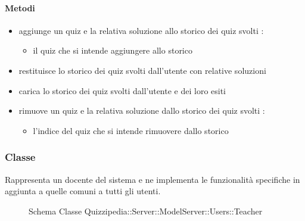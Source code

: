 \paragraph{Metodi}
\begin{itemize}
\item {}
\newline
aggiunge un quiz e la relativa soluzione allo storico dei quiz svolti
\newline
{} :
\begin{itemize}
\item {}
\newline
il quiz che si intende aggiungere allo storico
\end{itemize}
\item {}
\newline
restituisce lo storico dei quiz svolti dall'utente con relative soluzioni
\newline
\item {}
\newline
carica lo storico dei quiz svolti dall'utente e dei loro esiti
\newline
\item {}
\newline
rimuove un quiz e la relativa soluzione dallo storico dei quiz svolti
\newline
{} :
\begin{itemize}
\item {}
\newline
l'indice del quiz che si intende rimuovere dallo storico
\end{itemize}
\end{itemize}
\subsubsection{Classe }
Rappresenta un docente del sistema e ne implementa le funzionalità specifiche in aggiunta a quelle comuni a tutti gli utenti.
\begin{figure}[H]
\centering
\noindent{}
\caption[Schema Classe Teacher]{Schema Classe Quizzipedia::Server::ModelServer::Users::Teacher}
\end{figure}
